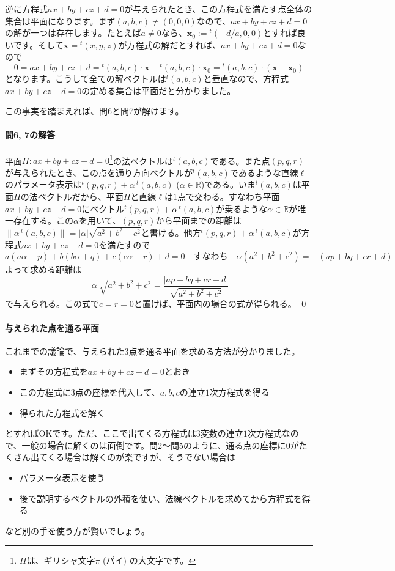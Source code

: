 逆に方程式$ax+by+cz+d=0$が与えられたとき、この方程式を満たす点全体の集合は平面になります。まず$(a,b,c)\neq(0,0,0)$なので、$ax+by+cz+d=0$の解が一つは存在します。たとえば$a\neq 0$なら、$\bm{x}_0 := {}^t(-d/a,0,0)$とすれば良いです。そして$\bm{x} = {}^t (x,y,z)$が方程式の解だとすれば、$ax+by+cz+d=0$なので
\[
0 = ax + by + cz + d  = {}^t (a,b,c) \cdot \bm{x} - {}^t (a,b,c) \cdot \bm{x}_0 = {}^t (a,b,c) \cdot (\bm{x}-\bm{x}_0)
\]
となります。こうして全ての解ベクトルは${}^t(a,b,c)$と垂直なので、方程式$ax+by+cz+d=0$の定める集合は平面だと分かりました。

この事実を踏まえれば、問6と問7が解けます。

\paragraph{問6, 7の解答} 平面$\Pi\colon ax+by+cz+d=0$\footnote{$\Pi$は、ギリシャ文字$\pi$ (パイ) の大文字です。}の法ベクトルは${}^t(a,b,c)$である。また点$(p, q, r)$が与えられたとき、この点を通り方向ベクトルが${}^t(a,b,c)$であるような直線$\ell$のパラメータ表示は${}^t(p, q, r)+\alpha\,{}^t(a, b, c)$ ($\alpha\in\mathbb{R}$)である。いま${}^t(a,b,c)$は平面$\Pi$の法ベクトルだから、平面$\Pi$と直線$\ell$は$1$点で交わる。すなわち平面$ax+by+cz+d=0$にベクトル${}^t(p, q, r)+\alpha\,{}^t(a, b, c)$が乗るような$\alpha\in\mathbb{R}$が唯一存在する。この$\alpha$を用いて、$(p, q, r)$から平面までの距離は$\|\alpha\,{}^t(a, b, c)\|=|\alpha|\sqrt{a^2+b^2+c^2}$と書ける。他方${}^t(p,q,r)+\alpha\,{}^t(a,b,c)$が方程式$ax+by+cz+d=0$を満たすので
\[
a(a\alpha + p) + b(b\alpha + q) + c(c\alpha + r ) + d = 0 \quad \text{すなわち} \quad \alpha(a^2+b^2+c^2) = -(ap+bq+cr+d)
\]
よって求める距離は
\[
|\alpha|\sqrt{a^2+b^2+c^2} = \frac{|ap+bq+cr+d|}{\sqrt{a^2+b^2+c^2}}
\]
で与えられる。この式で$c=r=0$と置けば、平面内の場合の式が得られる。 \qed

\paragraph{与えられた点を通る平面}

これまでの議論で、与えられた$3$点を通る平面を求める方法が分かりました。
\begin{itemize}
\item まずその方程式を$ax+by+cz+d=0$とおき
\item この方程式に$3$点の座標を代入して、$a,b,c$の連立$1$次方程式を得る
\item 得られた方程式を解く
\end{itemize}
とすればOKです。ただ、ここで出てくる方程式は$3$変数の連立$1$次方程式なので、一般の場合に解くのは面倒です。問2～問5のように、通る点の座標に$0$がたくさん出てくる場合は解くのが楽ですが、そうでない場合は
\begin{itemize}
\item パラメータ表示を使う
\item 後で説明するベクトルの外積を使い、法線ベクトルを求めてから方程式を得る
\end{itemize}
など別の手を使う方が賢いでしょう。

